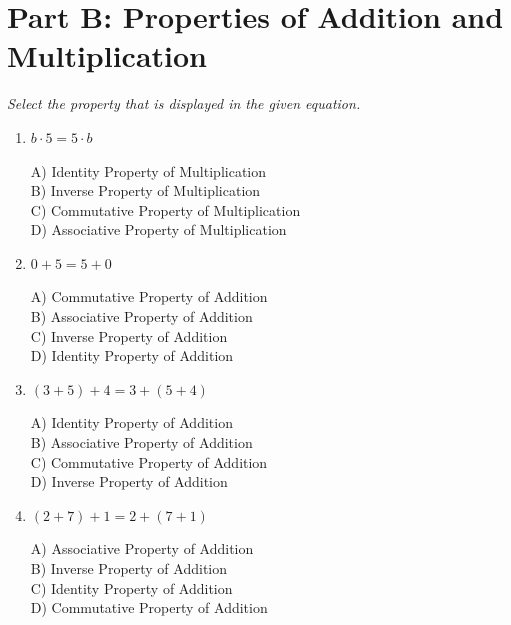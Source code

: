\documentclass[11pt]{article}
\begin{document}
\section*{Part B: Properties of Addition and Multiplication}
\noindent\textit{Select the property that is displayed in the given equation.}
\begin{enumerate}
  \item $b \cdot 5 = 5 \cdot b$
\\[2pt]
\begin{minipage}{\linewidth}
A) Identity Property of Multiplication \\
B) Inverse Property of Multiplication \\
C) Commutative Property of Multiplication \\
D) Associative Property of Multiplication
\end{minipage}
  \vspace{0.3cm}
  \item $0 + 5 = 5 + 0$
\\[2pt]
\begin{minipage}{\linewidth}
A) Commutative Property of Addition \\
B) Associative Property of Addition \\
C) Inverse Property of Addition \\
D) Identity Property of Addition
\end{minipage}
  \vspace{0.3cm}
  \item $(3 + 5) + 4 = 3 + (5 + 4)$
\\[2pt]
\begin{minipage}{\linewidth}
A) Identity Property of Addition \\
B) Associative Property of Addition \\
C) Commutative Property of Addition \\
D) Inverse Property of Addition
\end{minipage}
  \vspace{0.3cm}
  \item $(2 + 7) + 1 = 2 + (7 + 1)$
\\[2pt]
\begin{minipage}{\linewidth}
A) Associative Property of Addition \\
B) Inverse Property of Addition \\
C) Identity Property of Addition \\
D) Commutative Property of Addition
\end{minipage}
  \vspace{0.3cm}

\end{enumerate}
\end{document}

